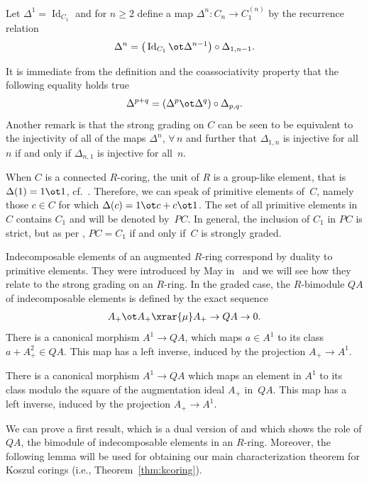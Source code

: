 Let $\Delta^1 = \operatorname{Id}_{C_1}$ and for $n \geq 2$ def\/ine a map $\Delta^n\colon C_n \to C_1^{(n)}$ by the recurrence relation
\begin{gather*}
	\Delta^n = \big(\operatorname{Id}_{C_1} \ot \Delta^{n-1}\big) \circ \Delta_{1,n-1}.
\end{gather*}

It is immediate from the def\/inition and the coassociativity property that the following equality holds true
\begin{gather*}
	\Delta^{p+q} = (\Delta^p \ot \Delta^q) \circ \Delta_{p,q}.
\end{gather*}
Another remark is that the strong grading on $C$ can be seen to be equivalent to the injectivity of all of the maps $\Delta^n$, $\forall\, n$ and further that $\Delta_{1,n}$ is injective for all $n$ if and only if $\Delta_{n,1}$ is injective for all~$n$.

When $C$ is a connected $R$-coring, the unit of $R$ is a group-like element, that is $\Delta(1) = 1 \ot 1$, cf.~\cite{jps}. Therefore, we can speak of primitive elements of~$C$, namely those $c \in C$ for which $\Delta(c) = 1 \ot c + c \ot 1$. The set of all primitive elements in $C$ contains $C_1$ and will be denoted by~$PC$. In general, the inclusion of $C_1$ in $PC$ is strict, but as per \cite[Lemma~1.4]{mst}, $PC = C_1$ if and only if~$C$ is strongly graded.

Indecomposable elements of an augmented $R$-ring correspond by duality to primitive elements. They were introduced by May in~\cite{may} and we will see how they relate to the strong grading on an $R$-ring. In the graded case, the $R$-bimodule $QA$ of indecomposable elements is def\/ined by the exact sequence
\begin{gather*} A_+ \ot A_+ \xrar{\mu} A_+ \to QA \to 0.\end{gather*}
There is a canonical morphism $A^1 \to QA$, which maps $a \in A^1$ to its class $a + A_+^2 \in QA$. This map has a left inverse, induced by the projection $A_+ \to A^1$.

There is a canonical morphism $A^1 \to QA$ which maps an element in $A^1$ to its class modulo the square of the augmentation ideal $A_+$ in~$QA$. This map has a left inverse, induced by the projection $A_+ \to A^1$.

We can prove a f\/irst result, which is a dual version of \cite[Lemma~1.4]{mst} and which shows the role of $QA$, the bimodule of indecomposable elements in an $R$-ring. Moreover, the following lemma will be used for obtaining our main characterization theorem for Koszul corings (i.e., Theorem~\ref{thm:kcoring}).

